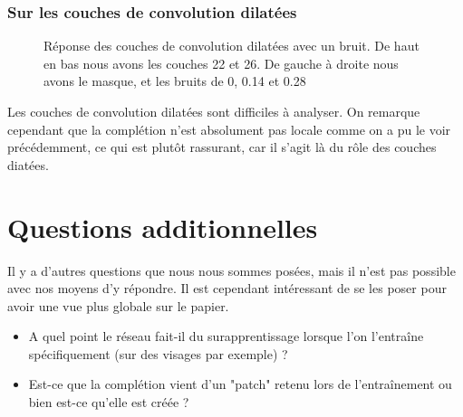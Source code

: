 \documentclass[12pt]{article}
\begin{document}
\subsubsection*{Sur les couches de convolution dilatées}
\begin{figure}[htb]
\centering
  \hfill
  \hfill
  \hfill
  \hfill
\end{figure}
\begin{figure}[htb]
\centering
  \hfill
  \hfill
  \hfill
  \hfill
  \caption{Réponse des couches de convolution dilatées avec un bruit. De haut en bas nous avons les couches 22 et 26. De gauche à droite nous avons le masque, et les bruits de 0, 0.14 et 0.28}\label{fig:occlus_dynamic}
\end{figure}

Les couches de convolution dilatées sont difficiles à analyser. On remarque cependant que la complétion n'est absolument pas locale comme on a pu le voir précédemment, ce qui est plutôt rassurant, car il s'agit là du rôle des couches diatées.

\section{Questions additionnelles}

Il y a d'autres questions que nous nous sommes posées, mais il n'est pas possible avec nos moyens d'y répondre. Il est cependant intéressant de se les poser pour avoir une vue plus globale sur le papier.
\begin{itemize}
    \item A quel point le réseau fait-il du surapprentissage lorsque l'on l'entraîne spécifiquement (sur des visages par exemple) ?
    \item Est-ce que la complétion vient d'un "patch" retenu lors de l'entraînement ou bien est-ce qu'elle est créée ?
\end{itemize}
\end{document}
